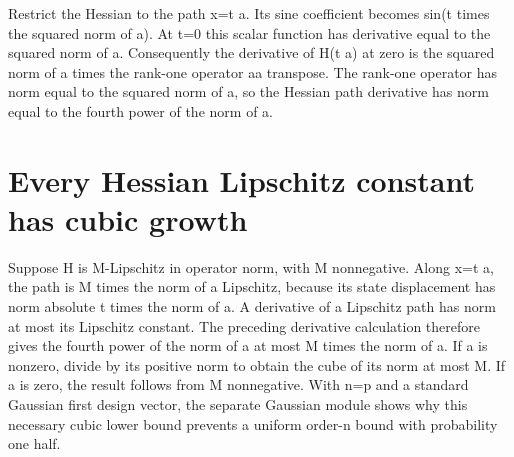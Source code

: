 \documentclass[11pt,a4paper]{article}
\begin{document}
Restrict the Hessian to the path x=t a. Its sine coefficient becomes sin(t times the squared norm of a). At t=0 this scalar function has derivative equal to the squared norm of a. Consequently the derivative of H(t a) at zero is the squared norm of a times the rank-one operator aa transpose. The rank-one operator has norm equal to the squared norm of a, so the Hessian path derivative has norm equal to the fourth power of the norm of a.


\section{\texorpdfstring{Every Hessian Lipschitz constant has cubic growth}{Every Hessian Lipschitz constant has cubic growth}}


Suppose H is M-Lipschitz in operator norm, with M nonnegative. Along x=t a, the path is M times the norm of a Lipschitz, because its state displacement has norm absolute t times the norm of a. A derivative of a Lipschitz path has norm at most its Lipschitz constant. The preceding derivative calculation therefore gives the fourth power of the norm of a at most M times the norm of a. If a is nonzero, divide by its positive norm to obtain the cube of its norm at most M. If a is zero, the result follows from M nonnegative. With n=p and a standard Gaussian first design vector, the separate Gaussian module shows why this necessary cubic lower bound prevents a uniform order-n bound with probability one half.
\end{document}

